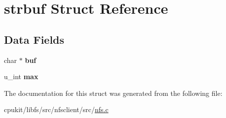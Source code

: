 \hypertarget{structstrbuf}{}\section{strbuf Struct Reference}
\label{structstrbuf}
\subsection*{Data Fields}
\begin{DoxyCompactItemize}
\item 
\mbox{\label{structstrbuf_a421c67aa5a9400a826e8e274f1ffb900}} 
char $\ast$ {\bfseries buf}
\item 
\mbox{\label{structstrbuf_a769032f047703cc56f243054897795e9}} 
u\+\_\+int {\bfseries max}
\end{DoxyCompactItemize}


The documentation for this struct was generated from the following file\+:\begin{DoxyCompactItemize}
\item 
cpukit/libfs/src/nfsclient/src/\mbox{\hyperlink{nfs_8c}{nfs.\+c}}\end{DoxyCompactItemize}
